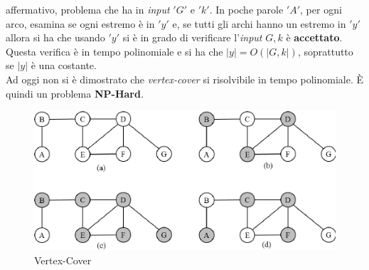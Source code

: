 \begin{definizione}
				affermativo, problema che ha in \textit{input} $ 'G' $ e $ 'k' $. In poche parole $ 'A' $, per ogni
				arco, esamina se ogni estremo è in $ 'y' $ e, se tutti gli archi hanno un estremo
				in $ 'y' $ allora si ha che usando $ 'y' $ si è in grado di verificare l'\textit{input} $G,
				k$ è \textbf{accettato}. Questa verifica è in tempo polinomiale e si ha che
				$|y|=O(|G,k|)$, soprattutto se $|y|$ è una costante.\\
				Ad oggi non si è dimostrato che \emph{vertex-cover} si risolvibile in tempo
				polinomiale. È quindi un problema \textbf{NP-Hard}.
				\begin{figure}[h!]
					\centering
					\includegraphics[width=1\textwidth]{img/Illustration-of-the-steps-of-the-approximate-vertex-cover-algorithm-as-performed-on-a.png}
					\caption{Vertex-Cover}
					\label{fig:Vertex-Cover}
				\end{figure}
			\end{definizione}
